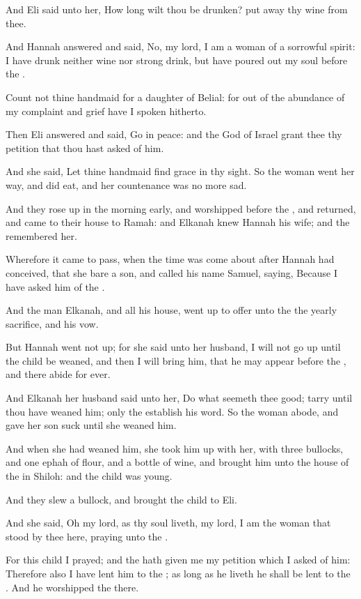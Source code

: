 \verse And Eli said unto her, How long wilt thou be drunken? put away thy wine from thee.

\verse And Hannah answered and said, No, my lord, I am a woman of a sorrowful spirit: I have drunk neither wine nor strong drink, but have poured out my soul before the \LORD.

\verse Count not thine handmaid for a daughter of Belial: for out of the abundance of my complaint and grief have I spoken hitherto.

\verse Then Eli answered and said, Go in peace: and the God of Israel grant thee thy petition that thou hast asked of him.

\verse And she said, Let thine handmaid find grace in thy sight. So the woman went her way, and did eat, and her countenance was no more sad.

\verse And they rose up in the morning early, and worshipped before the \LORD, and returned, and came to their house to Ramah: and Elkanah knew Hannah his wife; and the \LORD remembered her.

\verse Wherefore it came to pass, when the time was come about after Hannah had conceived, that she bare a son, and called his name Samuel, saying, Because I have asked him of the \LORD.

\verse And the man Elkanah, and all his house, went up to offer unto the \LORD the yearly sacrifice, and his vow.

\verse But Hannah went not up; for she said unto her husband, I will not go up until the child be weaned, and then I will bring him, that he may appear before the \LORD, and there abide for ever.

\verse And Elkanah her husband said unto her, Do what seemeth thee good; tarry until thou have weaned him; only the \LORD establish his word. So the woman abode, and gave her son suck until she weaned him.

\verse And when she had weaned him, she took him up with her, with three bullocks, and one ephah of flour, and a bottle of wine, and brought him unto the house of the \LORD in Shiloh: and the child was young.

\verse And they slew a bullock, and brought the child to Eli.

\verse And she said, Oh my lord, as thy soul liveth, my lord, I am the woman that stood by thee here, praying unto the \LORD.

\verse For this child I prayed; and the \LORD hath given me my petition which I asked of him: \verse Therefore also I have lent him to the \LORD; as long as he liveth he shall be lent to the \LORD. And he worshipped the \LORD there.


